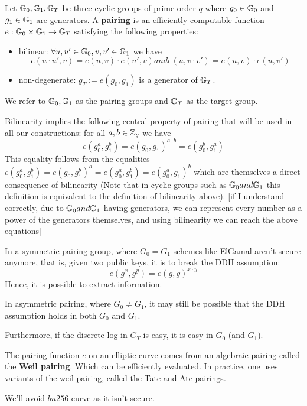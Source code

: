  \begin{definition}
  Let $\mathbb{G}_0, \mathbb{G}_1, \mathbb{G}_T$ be three cyclic groups of prime order $q$ where 
  $g_0\in\mathbb{G}_0$ and $g_1\in\mathbb{G}_1$ are generators. A \textbf{pairing} is an efficiently
  computable function $e: \mathbb{G}_0 \times \mathbb{G}_1 \to \mathbb{G}_T$ satisfying the 
  following properties:
  \begin{itemize}
    \item bilinear: $\forall u,u'\in\mathbb{G}_0, v,v'\in\mathbb{G}_1$  we have 
        $$ e(u\cdot u',v) = e(u,v) \cdot e(u',v) and  e(u,v\cdot v') = e(u,v)\cdot e(u,v')$$
    \item non-degenerate: $g_T := e(g_0,g_1)$  is a generator of $\mathbb{G}_T$.
  \end{itemize}
\end{definition}
We refer to $\mathbb{G}_0,\mathbb{G}_1$ as the pairing groups and $\mathbb{G}_T$ as the target group.

Bilinearity implies the following central property of pairing that will be used
in all our constructions: for all $a, b\in \mathbb{Z}_q$ we have
  $$ e(g_0^a,g_1^b)=e(g_0,g_1)^{a\cdot b}= e(g_0^b,g_1^a)$$
This equality follows from the equalities 
$e(g_0^a,g_1^b)=e(g_0,g_1^b)^a=e(g_0^a,g_1^b)=e(g_0^a,g_1)^b$
which are themselves a direct consequence of bilinearity (Note that in cyclic groups
 such as $\mathbb{G}_0 and \mathbb{G}_1$ this definition is equivalent to the definition of bilinearity above).
[if I understand correctly, due to $\mathbb{G}_0 and \mathbb{G}_1$ having generators, we can represent every number
as a power of the generators themselves, and using bilinearity we can reach the above equations]

In a symmetric pairing group, where $G_0 = G_1$ schemes like ElGamal aren't secure anymore,
that is, given two public keys, it is to break the DDH assumption: 
  $$ e(g^x,g^y) = e(g,g)^{x\cdot y}$$ 
Hence, it is possible to extract information. 

In asymmetric pairing, where $G_0 \neq G_1$, it may still be possible
that the DDH assumption holds in both $G_0$ and $G_1$. 

Furthermore, if the discrete log in $G_T$ is easy, it is easy in $G_0$ (and $G_1$).

\begin{rem}
  The pairing function $e$ on an elliptic curve comes from an algebraic pairing called the \textbf{Weil pairing}.
  Which can be efficiently evaluated. In practice, one uses variants of the weil 
  pairing, called the Tate and Ate pairings.
\end{rem}

We'll avoid $bn256$ curve as it isn't secure.


